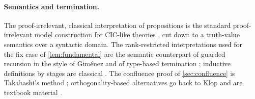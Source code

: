 \paragraph{Semantics and termination.}  The proof-irrelevant,
classical interpretation of propositions is the standard
proof-irrelevant model construction for CIC-like theories
\cite{Werner1997,MiquelWerner2003}, cut down to a truth-value semantics
over a syntactic domain.  The rank-restricted interpretations used for
the fix case of \cref{lem:fundamental} are the semantic counterpart of
guarded recursion in the style of Giménez \cite{Gimenez1995} and of
type-based termination \cite{BartheEtAl2004}; inductive definitions by
stages are classical \cite{Aczel1977}.  The confluence proof of
\cref{sec:confluence} is Takahashi's method \cite{Takahashi1995};
orthogonality-based alternatives go back to Klop \cite{Klop1980} and
are textbook material \cite{BaaderNipkow1998}.
